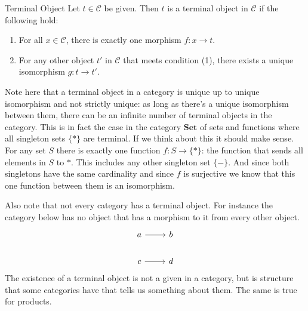 \documentclass[12pt]{article}
\begin{document}
\begin{definition}{Terminal Object}{}
    Let $t\in\mathcal{C}$ be given. Then $t$ is a terminal object in $\mathcal{C}$ if the following hold:
    \begin{enumerate}
        \item For all $x\in\mathcal{C}$, there is exactly one morphism $f:x\rightarrow t$.
        \item For any other object $t'$ in $\mathcal{C}$ that meets condition (1), there exists a unique isomorphism $g:t\rightarrow t'$.
    \end{enumerate}
\end{definition}
Note here that a terminal object in a category is unique up to unique isomorphism and not strictly unique: as long as there's a unique isomorphism between them, there can be an infinite number of terminal objects in the category.
This is in fact the case in the category $\textbf{Set}$ of sets and functions where all singleton sets $\{*\}$ are terminal.
If we think about this it should make sense.
For any set $S$ there is exactly one function $f:S \rightarrow \{*\}$: the function that sends all elements in $S$ to $*$.
This includes any other singleton set $\{-\}$.
And since both singletons have the same cardinality and since $f$ is surjective we know that this one function between them is an isomorphism.

Also note that not every category has a terminal object.
For instance the category below has no object that has a morphism to it from every other object.
\[\begin{tikzcd}
        a & b \\
        c & d
        \arrow[from=1-1, to=1-2]
        \arrow[from=2-1, to=2-2]
    \end{tikzcd}\]
The existence of a terminal object is not a given in a category, but is structure that some categories have that tells us something about them.
The same is true for products.
\end{document}
